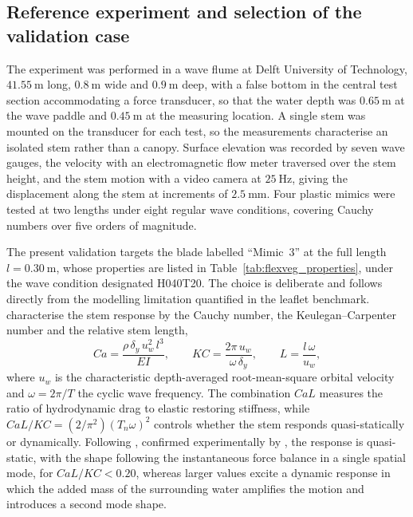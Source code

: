 \subsection{Reference experiment and selection of the validation case}
\label{sec:flexveg_case_selection}
The experiment was performed in a wave flume at Delft University of Technology, $41.55~\mathrm{m}$ long, $0.8~\mathrm{m}$ wide and $0.9~\mathrm{m}$ deep, with a false bottom in the central test section accommodating a force transducer, so that the water depth was $0.65~\mathrm{m}$ at the wave paddle and $0.45~\mathrm{m}$ at the measuring location. A single stem was mounted on the transducer for each test, so the measurements characterise an isolated stem rather than a canopy. Surface elevation was recorded by seven wave gauges, the velocity with an electromagnetic flow meter traversed over the stem height, and the stem motion with a video camera at $25~\mathrm{Hz}$, giving the displacement along the stem at increments of $2.5~\mathrm{mm}$. Four plastic mimics were tested at two lengths under eight regular wave conditions, covering Cauchy numbers over five orders of magnitude.

\noindent
The present validation targets the blade labelled ``Mimic~3'' at the full length $l = 0.30~\mathrm{m}$, whose properties are listed in Table~\ref{tab:flexveg_properties}, under the wave condition designated H040T20. The choice is deliberate and follows directly from the modelling limitation quantified in the leaflet benchmark. \citet{jacobsen_waveinduced_2019} characterise the stem response by the Cauchy number, the Keulegan--Carpenter number and the relative stem length,
\begin{equation}
\label{eq:flexveg_nondim}
Ca = \frac{\rho\,\delta_y\,u_w^{2}\,l^{3}}{EI},
\qquad
KC = \frac{2\pi\,u_w}{\omega\,\delta_y},
\qquad
L = \frac{l\,\omega}{u_w},
\end{equation}
where $u_w$ is the characteristic depth-averaged root-mean-square orbital velocity and $\omega = 2\pi/T$ the cyclic wave frequency. The combination $CaL$ measures the ratio of hydrodynamic drag to elastic restoring stiffness, while $CaL/KC = (2/\pi^{2})(T_n\omega)^{2}$ controls whether the stem responds quasi-statically or dynamically. Following \citet{leclercq_reconfiguration_2018}, confirmed experimentally by \citet{jacobsen_waveinduced_2019}, the response is quasi-static, with the shape following the instantaneous force balance in a single spatial mode, for $CaL/KC < 0.20$, whereas larger values excite a dynamic response in which the added mass of the surrounding water amplifies the motion and introduces a second mode shape.

